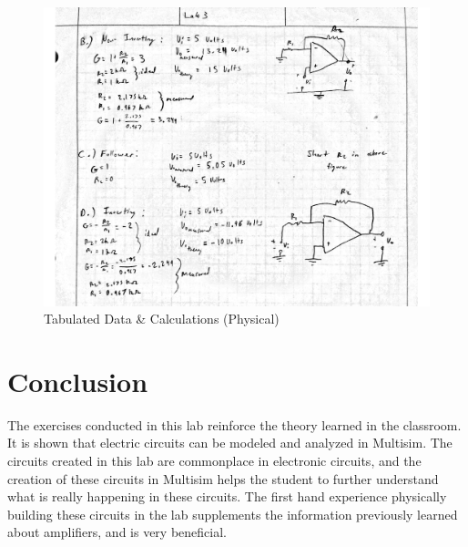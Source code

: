 \documentclass[12pt]{article}
\begin{document}
\newpage

\begin{figure}[htbp] %
   \centering
   \includegraphics[width=\linewidth]{lab_calculations.pdf} 
   \caption{Tabulated Data \& Calculations (Physical)}
   \label{fig:example}
\end{figure}
\bigskip



\section*{\fontsize{12}{12}\selectfont \large Conclusion}
The exercises conducted in this lab reinforce the theory learned in the classroom. It is shown that electric circuits can be modeled and analyzed in Multisim. The circuits created in this lab are commonplace in electronic circuits, and the creation of these circuits in Multisim helps the student to further understand what is really happening in these circuits. The first hand experience physically building these circuits in the lab supplements the information previously learned about amplifiers, and is very beneficial.



\begin{thebibliography}{2}


\end{thebibliography}




\end{document}
